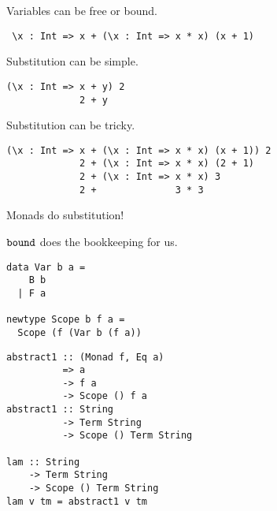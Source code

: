 \documentclass{beamer}
\begin{document}
\begin{frame}[fragile]
  \begin{center}
   Variables can be free or bound.
  \end{center}
  \begin{verbatim}
 \x : Int => x + (\x : Int => x * x) (x + 1)
  \end{verbatim}  
\end{frame}

\begin{frame}[fragile]
  \begin{center}
   Substitution can be simple.
  \end{center}
  \begin{verbatim}
(\x : Int => x + y) 2
             2 + y
  \end{verbatim}  
\end{frame}

\begin{frame}[fragile]
  \begin{center}
   Substitution can be tricky.
  \end{center}
  \begin{verbatim}
(\x : Int => x + (\x : Int => x * x) (x + 1)) 2
             2 + (\x : Int => x * x) (2 + 1)
             2 + (\x : Int => x * x) 3
             2 +              3 * 3
  \end{verbatim}  
\end{frame}

\begin{frame}[fragile]
  \begin{center}
    Monads do substitution!
  \end{center}
\end{frame}

\begin{frame}[fragile]
  \begin{center}
    $\tt{bound}$ does the bookkeeping for us.
  \end{center}
\end{frame}

\begin{frame}[fragile]
  \begin{verbatim}
data Var b a = 
    B b 
  | F a

newtype Scope b f a = 
  Scope (f (Var b (f a))
  \end{verbatim}  
\end{frame}

\begin{frame}[fragile]
  \begin{verbatim}
abstract1 :: (Monad f, Eq a) 
          => a 
          -> f a 
          -> Scope () f a
abstract1 :: String 
          -> Term String 
          -> Scope () Term String

lam :: String 
    -> Term String 
    -> Scope () Term String
lam v tm = abstract1 v tm
  \end{verbatim}  
\end{frame}
\end{document}
